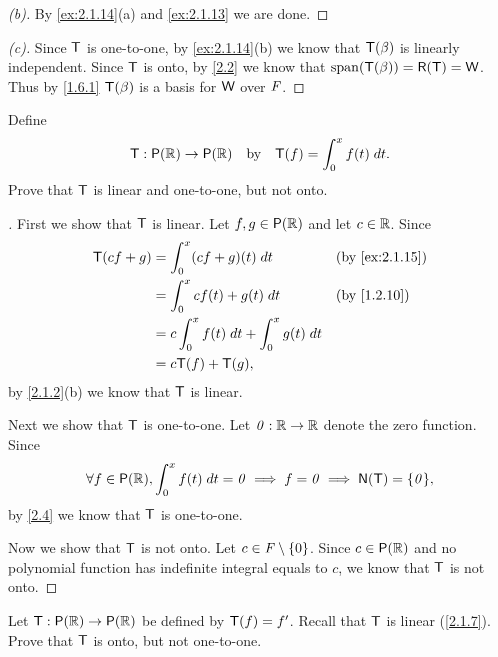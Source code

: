 \begin{proof}[(b)]
  By \cref{ex:2.1.14}(a) and \cref{ex:2.1.13} we are done.
\end{proof}

\begin{proof}[(c)]
  Since \(\mathsf{T}\) is one-to-one, by \cref{ex:2.1.14}(b) we know that \(\mathsf{T}(\beta)\) is linearly independent.
  Since \(\mathsf{T}\) is onto, by \cref{2.2} we know that \(\spn{\T(\beta)} = \rg{\T} = \W\).
  Thus by \cref{1.6.1} \(\mathsf{T}(\beta)\) is a basis for \(\mathsf{W}\) over \(\mathit{F}\).
\end{proof}

\begin{ex}\label{ex:2.1.15}
  Define
  \[
    \T : \ps{\R} \to \ps{\R} \quad \text{by} \quad \T(f) = \int_0^x f(t) \; dt.
  \]
  Prove that \(\mathsf{T}\) is linear and one-to-one, but not onto.
\end{ex}

\begin{proof}[]
  First we show that \(\mathsf{T}\) is linear.
  Let \(f, g \in \ps{\R}\) and let \(c \in \mathbb{R}\).
  Since
  \begin{align*}
    \T(cf + g) & = \int_0^x (cf + g)(t) \; dt                  &  & \text{(by \cref{ex:2.1.15})} \\
               & = \int_0^x cf(t) + g(t) \; dt                 &  & \text{(by \cref{1.2.10})}    \\
               & = c \int_0^x f(t) \; dt + \int_0^x g(t) \; dt                                   \\
               & = c \T(f) + \T(g),
  \end{align*}
  by \cref{2.1.2}(b) we know that \(\mathsf{T}\) is linear.

  Next we show that \(\mathsf{T}\) is one-to-one.
  Let \(\mathit{0} : \mathbb{R} \to \mathbb{R}\) denote the zero function.
  Since
  \[
    \forall f \in \ps{\R}, \int_0^x f(t) \; dt = \zv \implies f = \zv \implies \ns{\T} = \set{\zv},
  \]
  by \cref{2.4} we know that \(\mathsf{T}\) is one-to-one.

  Now we show that \(\mathsf{T}\) is not onto.
  Let \(c \in \mathit{F} \setminus \left\lbrace0\right\rbrace\).
  Since \(c \in \ps{\R}\) and no polynomial function has indefinite integral equals to \(c\), we know that \(\mathsf{T}\) is not onto.
\end{proof}

\begin{ex}\label{ex:2.1.16}
  Let \(\T : \ps{\R} \to \ps{\R}\) be defined by \(\mathsf{T}(f) = f'\).
  Recall that \(\mathsf{T}\) is linear (\cref{2.1.7}).
  Prove that \(\mathsf{T}\) is onto, but not one-to-one.
\end{ex}

